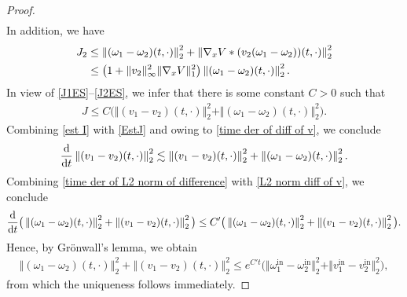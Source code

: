 \documentclass[11pt,reqno]{amsart}
\numberwithin{equation}{section}
\def\dd{{\rm d}}
\begin{document}
\begin{proof}
\begin{align}
\end{align}
In addition, we have 
\begin{align}
J_{2}&\leq \left\Vert (\omega_{1}-\omega_{2})(t,\cdot)\right\Vert_{2}^{2}+\left\Vert \nabla_{x}V\ast (v_{2}(\omega_{1}-\omega_{2}))(t,\cdot)\right\Vert_{2}^{2}\notag\\
&\leq \big(1+\Vert v_{2}\Vert_{\infty}^{2} \Vert \nabla_{x}V\Vert_{1}^{2}\big)
\left\Vert (\omega_{1}-\omega_{2})(t,\cdot)\right\Vert_{2}^{2}.  \label{J2ES}      
\end{align}
In view of \eqref{J1ES}--\eqref{J2ES}, we infer that there is some constant 
$C>0$ such that 
\begin{align}
J\leq C\big(\Vert (v_{1}-v_{2})(t,\cdot)\Vert_{2}^{2}+\Vert (\omega_{1}-\omega_{2})(t,\cdot)\Vert_{2}^{2}\big).  \label{EstJ}    
\end{align}
Combining \eqref{est I} with \eqref{EstJ} and owing to \eqref{time der of diff of v}, 
we conclude 
\begin{align}
\frac{\dd}{\dd t}\left\Vert (v_{1}-v_{2})(t,\cdot)\right\Vert_{2}^{2}\lesssim \left\Vert (v_{1}-v_{2})(t,\cdot)\right\Vert_{2}^{2}+\left\Vert (\omega_{1}-\omega_{2})(t,\cdot)\right\Vert_{2}^{2}. \label{L2 norm diff of v}
\end{align}
Combining \eqref{time der of L2 norm of difference} with \eqref{L2 norm diff of v}, we conclude 
\begin{align*}
\frac{\dd}{\dd t}\big(\left\Vert (\omega_{1}-\omega_{2})(t,\cdot)\right\Vert_{2}^{2}+\left\Vert (v_{1}-v_{2})(t,\cdot)\right\Vert_{2}^{2}  \big)\leq C'\big(\left\Vert (\omega_{1}-\omega_{2})(t,\cdot)\right\Vert_{2}^{2}+\left\Vert (v_{1}-v_{2})(t,\cdot)\right\Vert_{2}^{2}\big).     
\end{align*}
Hence, by Gr\"onwall's lemma, we obtain 
\begin{align*}
\left\Vert (\omega_{1}-\omega_{2})(t,\cdot)\right\Vert_{2}^{2}+\left\Vert (v_{1}-v_{2})(t,\cdot) \right\Vert_{2}^{2}
\leq e^{C't}\big(\Vert \omega_{1}^{\mathrm{in}}-\omega_{2}^{\mathrm{in}}\Vert_{2}^{2}
+\Vert v_{1}^{\mathrm{in}}-v_{2}^{\mathrm{in}}\Vert_{2}^{2} \big),
\end{align*}
from which the uniqueness follows immediately.


\end{proof}
\end{document}
